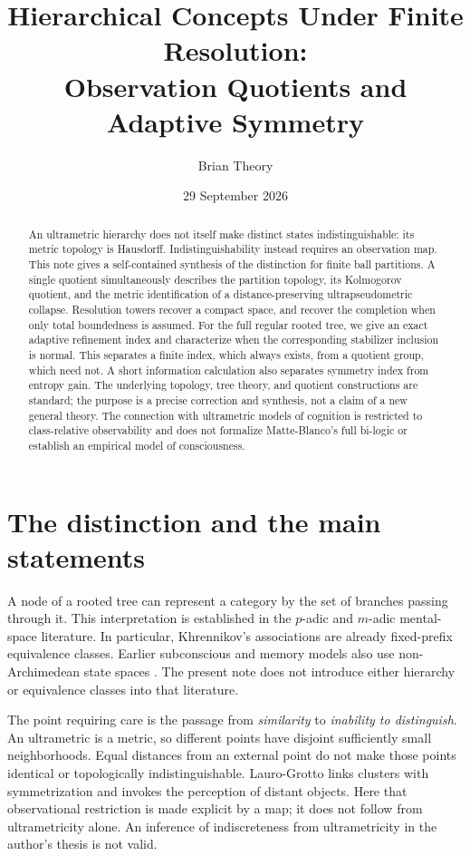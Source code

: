\documentclass[11pt]{article}
\title{Hierarchical Concepts Under Finite Resolution:\\
Observation Quotients and Adaptive Symmetry}
\author{Brian Theory}
\date{29 September 2026}
\theoremstyle{definition}
\theoremstyle{remark}
\begin{document}
\maketitle
\begin{abstract}
An ultrametric hierarchy does not itself make distinct states indistinguishable: its metric topology is Hausdorff. Indistinguishability instead requires an observation map. This note gives a self-contained synthesis of the distinction for finite ball partitions. A single quotient simultaneously describes the partition topology, its Kolmogorov quotient, and the metric identification of a distance-preserving ultrapseudometric collapse. Resolution towers recover a compact space, and recover the completion when only total boundedness is assumed. For the full regular rooted tree, we give an exact adaptive refinement index and characterize when the corresponding stabilizer inclusion is normal. This separates a finite index, which always exists, from a quotient group, which need not. A short information calculation also separates symmetry index from entropy gain. The underlying topology, tree theory, and quotient constructions are standard; the purpose is a precise correction and synthesis, not a claim of a new general theory. The connection with ultrametric models of cognition is restricted to class-relative observability and does not formalize Matte-Blanco's full bi-logic or establish an empirical model of consciousness.
\end{abstract}

\section{The distinction and the main statements}
A node of a rooted tree can represent a category by the set of branches passing through it. This interpretation is established in the $p$-adic and $m$-adic mental-space literature. In particular, Khrennikov's \cite[Section 4]{Khrennikov2007} associations are already fixed-prefix equivalence classes. Earlier subconscious and memory models also use non-Archimedean state spaces \cite{Khrennikov1998,Albeverio1999}. The present note does not introduce either hierarchy or equivalence classes into that literature.

The point requiring care is the passage from \emph{similarity} to \emph{inability to distinguish}. An ultrametric is a metric, so different points have disjoint sufficiently small neighborhoods. Equal distances from an external point do not make those points identical or topologically indistinguishable. Lauro-Grotto \cite[pp.~537--539]{LauroGrotto2008} links clusters with symmetrization and invokes the perception of distant objects. Here that observational restriction is made explicit by a map; it does not follow from ultrametricity alone. An inference of indiscreteness from ultrametricity in the author's thesis \cite{Droncheff2015} is not valid.
\end{document}
